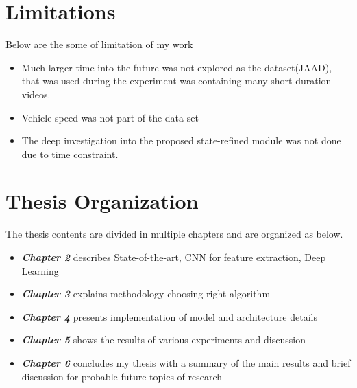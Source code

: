 \section{Limitations}
Below are the some of limitation of my work
\begin{itemize}
	\item Much larger time into the future was not explored as the dataset(JAAD), that was used during the experiment was containing many short duration videos. 

	\item Vehicle speed was not part of the data set
	\item The deep investigation into the proposed state-refined module was not done due to time constraint.
\end{itemize}

\section{Thesis Organization }
The thesis contents are divided in multiple chapters and are organized as below.
\begin{itemize}
  \item {\textbf {\textit{Chapter 2}} describes State-of-the-art, CNN for feature extraction, Deep Learning}
  \item {\textbf {\textit{Chapter 3}} explains methodology choosing right algorithm}
	\item {\textbf {\textit{Chapter 4}} presents implementation of model and architecture details  }
	\item {\textbf {\textit{Chapter 5}} shows the results of various experiments and discussion  }
	\item {\textbf {\textit{Chapter 6}} concludes my thesis with a summary of the main results and brief discussion for probable future topics of research}
\end{itemize}